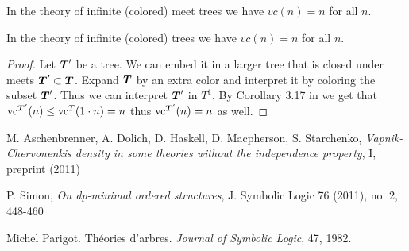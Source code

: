\documentclass{amsart}
\DeclareMathOperator{\TT}{\boldface T}
\begin{document}
	\begin{Corollary}
		In the theory of infinite (colored) meet trees we have $vc(n) = n$ for all $n$.
	\end{Corollary}
	\begin{Corollary}
		In the theory of infinite (colored) trees we have $vc(n) = n$ for all $n$.
	\end{Corollary}
	\begin{proof}
		Let $\TT'$ be a tree. We can embed it in a larger tree that is closed under meets $\TT' \subset \TT$. Expand $\TT$ by an extra color and interpret it by coloring the subset $\TT'$. Thus we can interpret $\TT'$ in $T^1$. By Corollary 3.17 in \cite{vc_density} we get that $\vc^{\TT'}(n) \leq \vc^T(1 \cdot n) = n$ thus $\vc^{\TT'}(n) = n$ as well.
	\end{proof}

\begin{thebibliography}{9}

	M. Aschenbrenner, A. Dolich, D. Haskell, D. Macpherson, S. Starchenko,
	\textit{Vapnik-Chervonenkis density in some theories without the independence property}, I, preprint (2011)

	P. Simon,
	\textit{On dp-minimal ordered structures},
	J. Symbolic Logic 76 (2011), no. 2, 448-460

	Michel Parigot.
	Th\'eories d'arbres.
	\textit{Journal of Symbolic Logic}, 47, 1982.
	
	
\end{thebibliography}
\end{document}
